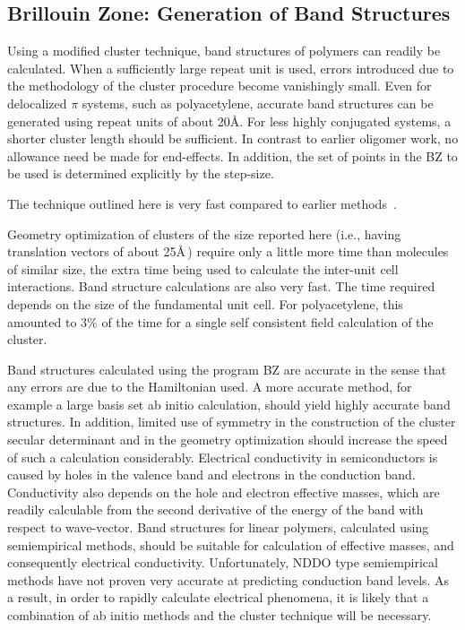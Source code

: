 \subsection{Brillouin Zone: Generation of Band Structures}
Using a modified cluster technique, band structures of  polymers can readily be
calculated.  When a sufficiently large  repeat unit is used,  errors introduced
due to  the methodology of the cluster procedure become vanishingly small.
 Even for delocalized
$\pi$ systems, such as polyacetylene, accurate band structures can be
generated  using repeat units of about 20\AA .  For less highly conjugated
systems, a shorter cluster length should be sufficient.    In
contrast to earlier oligomer work, no allowance need be  made for end-effects.
In addition, the set of points in the BZ  to be used is determined explicitly
by the step-size.

The technique outlined here is very fast compared to earlier
methods~\cite{mosol}.

Geometry optimization of clusters of the size reported  here (i.e., having
translation vectors of about 25\AA\,) require  only a little more time than
molecules of similar size, the extra time  being used to calculate the
inter-unit cell interactions.  Band  structure calculations are also very
fast.  The time required  depends on the size of the fundamental unit cell.
For  polyacetylene, this amounted to 3\% of the time for a single self
consistent field calculation of the cluster.

Band structures calculated using the program BZ are accurate in the sense  that
any errors are due to the Hamiltonian used.  A more accurate   method, for example a large basis set
ab initio calculation,  should yield highly accurate band structures.  In
addition,  limited use of symmetry in the construction of the cluster  secular
determinant and in the geometry optimization should  increase the speed of such
a calculation considerably.   Electrical conductivity in semiconductors is
caused by holes  in the valence band and electrons in the conduction band.
Conductivity also depends on the hole and electron effective  masses, which are
readily calculable from the second derivative  of the energy of the band with
respect to wave-vector.  Band  structures for linear polymers, calculated using
semiempirical  methods, should be suitable for calculation of effective
masses,   and consequently electrical
conductivity.  Unfortunately, NDDO  type semiempirical methods have not proven
very accurate at  predicting conduction band levels.  As a result, in order to
rapidly calculate electrical phenomena, it is likely that a  combination of ab
initio methods and the cluster technique will  be necessary.


